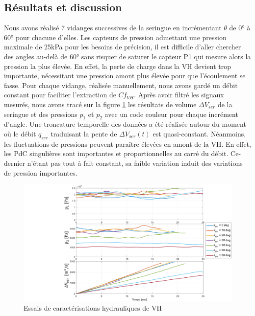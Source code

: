 	\subsection{Résultats et discussion}
	\label{subsec:4.4.2_Resultats et discussion}    
Nous avons réalisé 7 vidanges successives de la seringue en incrémentant $\theta$ de \ang{0} à \ang{60} pour chacune d'elles. Les capteurs de pression admettant une pression maximale de 25kPa pour les besoins de précision, il est difficile d'aller chercher des angles au-delà de \ang{60} sans risquer de saturer le capteur P1 qui mesure alors la pression la plus élevée. En effet, la perte de charge dans la VH devient trop importante, nécessitant une pression amont plus élevée pour que l'écoulement se fasse. Pour chaque vidange, réalisée manuellement, nous avons gardé un débit constant pour faciliter l'extraction de $Cf_{VH}$. Après avoir filtré les signaux mesurés, nous avons tracé sur la figure \ref{fig:resultats_essais_hydraulique_P1,P2,Qe_D1mm} les résultats de volume $\Delta V_{ser}$ de la seringue et des pressions $p_1$ et $p_2$ avec un code couleur pour chaque incrément d'angle. Une troncature temporelle des données a été réalisée autour du moment où le débit $q_{ser}$ traduisant la pente de $\Delta V_{ser}(t)$ est quasi-constant. Néanmoins, les fluctuations de pressions peuvent paraître élevées en amont de la VH. En effet, les PdC singulières sont importantes et proportionnelles au carré du débit. Ce-dernier n'étant pas tout à fait constant, sa faible variation induit des variations de pression importantes.
\begin{figure}[!htb]
\begin{center}
    \captionsetup{justification=centering} 
	\includegraphics[trim={6cm 0cm 0cm 0cm},clip,width=\textwidth]{../Chap4/Figure/resultats_essais_hydraulique_P1,P2,Qe_D1mm.pdf}
	\caption{Essais de caractérisations hydrauliques de VH}
	\label{fig:resultats_essais_hydraulique_P1,P2,Qe_D1mm}
\end{center}	
\end{figure}    

